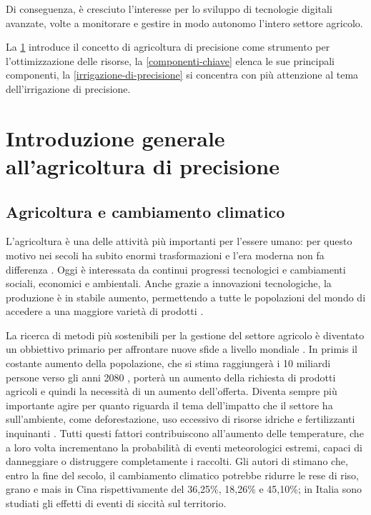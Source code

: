 \documentclass[12pt,a4paper,openright,twoside]{book}
\begin{document}
Di conseguenza, è cresciuto l'interesse per lo sviluppo di tecnologie digitali avanzate, volte a monitorare e gestire in modo autonomo l'intero settore agricolo.

La \cref{introduzione-agricoltura-precisione} introduce il concetto di agricoltura di precisione come strumento per l'ottimizzazione delle risorse, la \cref{componenti-chiave} elenca le sue principali componenti, la \cref{irrigazione-di-precisione} si concentra con più attenzione al tema dell'irrigazione di precisione.

\section{Introduzione generale all’agricoltura di precisione}\label{introduzione-agricoltura-precisione}

\subsection{Agricoltura e cambiamento climatico}

L'agricoltura è una delle attività più importanti per l'essere umano: per questo motivo nei secoli ha subito enormi trasformazioni e l'era moderna non fa differenza \cite{FEDERICO-FEEDING-2005}. Oggi è interessata da continui progressi tecnologici e cambiamenti sociali, economici e ambientali. Anche grazie a innovazioni tecnologiche, la produzione è in stabile aumento, permettendo a tutte le popolazioni del mondo di accedere a una maggiore varietà di prodotti \cite{FAO-AGRO-STATS-2023}.

La ricerca di metodi più sostenibili per la gestione del settore agricolo è diventato un obbiettivo primario per affrontare nuove sfide a livello mondiale \cite{SDG-2-4-1}. In primis il costante aumento della popolazione, che si stima raggiungerà i 10 miliardi persone verso gli anni 2080 \cite{UN-POPULATION-2024}, porterà un aumento della richiesta di prodotti agricoli e quindi la necessità di un aumento dell'offerta. Diventa sempre più importante agire per quanto riguarda il tema dell'impatto che il settore ha sull'ambiente, come deforestazione, uso eccessivo di risorse idriche e fertilizzanti inquinanti \cite{EIOM-2012}.
Tutti questi fattori contribuiscono all'aumento delle temperature, che a loro volta incrementano la probabilità di eventi meteorologici estremi, capaci di danneggiare o distruggere completamente i raccolti. Gli autori di \cite{ZHANG-PENG-2017} stimano che, entro la fine del secolo, il cambiamento climatico potrebbe ridurre le rese di riso, grano e mais in Cina rispettivamente del 36,25\%, 18,26\% e 45,10\%; in Italia sono studiati gli effetti di eventi di siccità sul territorio\cite{Garcia2021}.
\end{document}
